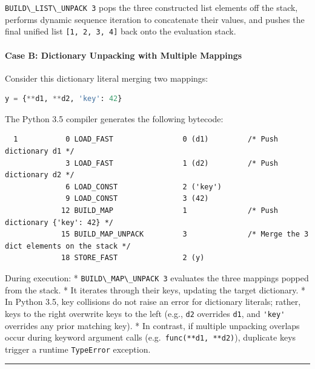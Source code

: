 \passthrough{\lstinline!BUILD\_LIST\_UNPACK 3!} pops the three
constructed list elements off the stack, performs dynamic sequence
iteration to concatenate their values, and pushes the final unified list
\passthrough{\lstinline![1, 2, 3, 4]!} back onto the evaluation stack.

\hypertarget{case-b-dictionary-unpacking-with-multiple-mappings}{%
\paragraph{Case B: Dictionary Unpacking with Multiple
Mappings}\label{case-b-dictionary-unpacking-with-multiple-mappings}}

Consider this dictionary literal merging two mappings:

\begin{lstlisting}[language=Python]
y = {**d1, **d2, 'key': 42}
\end{lstlisting}

The Python 3.5 compiler generates the following bytecode:

\begin{lstlisting}
  1           0 LOAD_FAST                0 (d1)         /* Push dictionary d1 */
              3 LOAD_FAST                1 (d2)         /* Push dictionary d2 */
              6 LOAD_CONST               2 ('key')
              9 LOAD_CONST               3 (42)
             12 BUILD_MAP                1              /* Push dictionary {'key': 42} */
             15 BUILD_MAP_UNPACK         3              /* Merge the 3 dict elements on the stack */
             18 STORE_FAST               2 (y)
\end{lstlisting}

During execution: * \passthrough{\lstinline!BUILD\_MAP\_UNPACK 3!}
evaluates the three mappings popped from the stack. * It iterates
through their keys, updating the target dictionary. * In Python 3.5, key
collisions do not raise an error for dictionary literals; rather, keys
to the right overwrite keys to the left (e.g.,
\passthrough{\lstinline!d2!} overrides \passthrough{\lstinline!d1!}, and
\passthrough{\lstinline!'key'!} overrides any prior matching key). * In
contrast, if multiple unpacking overlaps occur during keyword argument
calls (e.g.~\passthrough{\lstinline!func(**d1, **d2)!}), duplicate keys
trigger a runtime \passthrough{\lstinline!TypeError!} exception.

\begin{center}\rule{0.5\linewidth}{0.5pt}\end{center}
